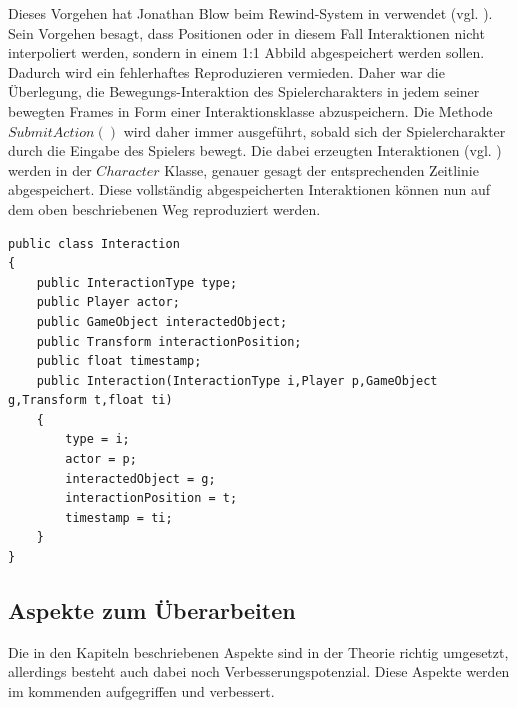 Dieses Vorgehen hat Jonathan Blow beim Rewind-System in  verwendet (vgl. \cite{gdc_implementation_2016}). Sein Vorgehen besagt, dass Positionen oder in diesem Fall Interaktionen nicht interpoliert werden, sondern in einem 1:1 Abbild abgespeichert werden sollen. Dadurch wird ein fehlerhaftes Reproduzieren vermieden. Daher war die Überlegung, die Bewegungs-Interaktion des Spielercharakters in jedem seiner bewegten Frames in Form einer Interaktionsklasse abzuspeichern. Die Methode $SubmitAction()$ wird daher immer ausgeführt, sobald sich der Spielercharakter durch die Eingabe des Spielers bewegt. Die dabei erzeugten Interaktionen (vgl. ) werden in der $Character$ Klasse, genauer gesagt der entsprechenden Zeitlinie abgespeichert. Diese vollständig abgespeicherten Interaktionen können nun auf dem oben beschriebenen Weg reproduziert werden.

\begin{lstlisting}[caption={Interaktionsklasse}, label={sec:interaction_old}]
public class Interaction
{
    public InteractionType type;
    public Player actor;
    public GameObject interactedObject;
    public Transform interactionPosition;
    public float timestamp;
    public Interaction(InteractionType i,Player p,GameObject g,Transform t,float ti)
    {
        type = i;
        actor = p;
        interactedObject = g;
        interactionPosition = t;
        timestamp = ti;
    }
}

\end{lstlisting}

\subsection{Aspekte zum Überarbeiten}
Die in den Kapiteln  beschriebenen Aspekte sind in der Theorie richtig umgesetzt, allerdings besteht auch dabei noch Verbesserungspotenzial. Diese Aspekte werden im kommenden  aufgegriffen und verbessert.

